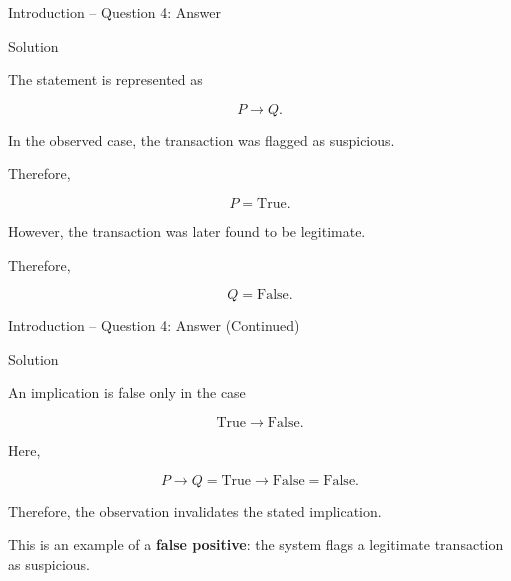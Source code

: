 \begin{frame}{Introduction -- Question 4: Answer}

\begin{exampleblock}{Solution}

The statement is represented as

\[
P\rightarrow Q.
\]

In the observed case, the transaction was flagged as suspicious.

Therefore,

\[
P=\mathrm{True}.
\]

However, the transaction was later found to be legitimate.

Therefore,

\[
Q=\mathrm{False}.
\]

\end{exampleblock}

\end{frame}


\begin{frame}{Introduction -- Question 4: Answer (Continued)}

\begin{exampleblock}{Solution}

An implication is false only in the case

\[
\mathrm{True}\rightarrow\mathrm{False}.
\]

Here,

\[
P\rightarrow Q
=
\mathrm{True}\rightarrow\mathrm{False}
=
\mathrm{False}.
\]

Therefore, the observation invalidates the stated implication.

\medskip

This is an example of a \textbf{false positive}: the system flags a
legitimate transaction as suspicious.

\end{exampleblock}

\end{frame}


